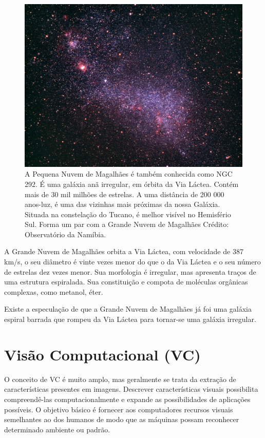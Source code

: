 \begin{figure}[ht!] 
\centering 
\includegraphics[width=12cm]{imagens/pequena_nuvem_magalhaes.jpg} 
\caption{A Pequena Nuvem de Magalhães é também conhecida como NGC 292. É uma galáxia anã irregular, em órbita da Via Láctea. Contém mais de 30 mil milhões de estrelas. A uma distância de 200 000 anos-luz, é uma das vizinhas mais próximas da nossa Galáxia. Situada na constelação do Tucano, é melhor visível no Hemisfério Sul. Forma um par com a Grande Nuvem de Magalhães Crédito: Observatório da Namíbia.}
\label{fig:PequenaNuvendeMagalhães} 
\end{figure} 

A Grande Nuvem de Magalhães orbita a Via Láctea, com velocidade de 387 km/s, o seu diâmetro é vinte vezes menor do que o da Via Láctea e o seu número de estrelas dez vezes menor. Sua morfologia é irregular, mas apresenta traços de uma estrutura espiralada. Sua constituição e compota de moléculas orgânicas complexas, como metanol, éter. 

Existe a especulação de que a Grande Nuvem de Magalhães já foi uma galáxia espiral barrada que rompeu da Via Láctea para tornar-se uma galáxia irregular. 

\section{Visão Computacional (VC)}\label{vc} 

O conceito de VC é muito amplo, mas geralmente se trata da extração de características presentes em imagens. Descrever características visuais possibilita compreendê-las computacionalmente e expande as possibilidades de aplicações possíveis. O objetivo básico é fornecer aos computadores recursos visuais semelhantes ao dos humanos de modo que as máquinas possam reconhecer determinado ambiente ou padrão. 

